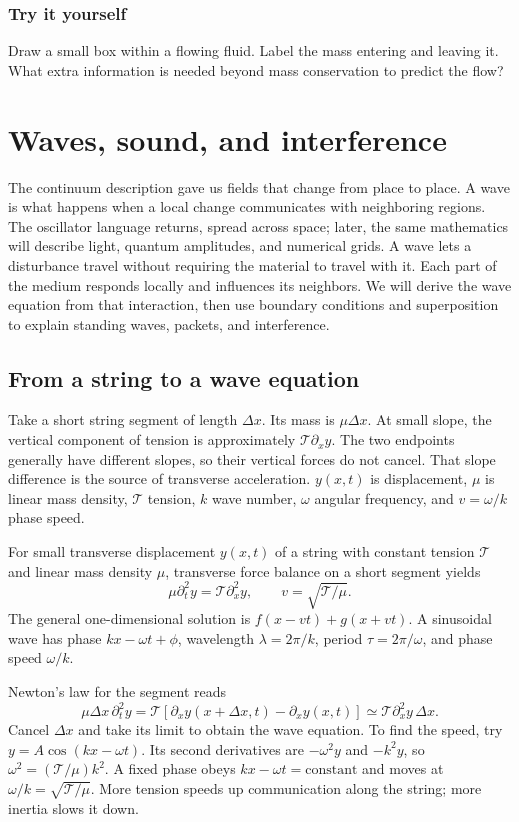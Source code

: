 \documentclass[11pt,oneside]{book}
\theoremstyle{reviewstyle}
\newcommand{\learningcheck}[1]{\subsection*{Try it yourself}\noindent #1\par}
\begin{document}
\learningcheck{Draw a small box within a flowing fluid. Label the mass entering and leaving it. What extra information is needed beyond mass conservation to predict the flow?}

\chapter{Waves, sound, and interference}
The continuum description gave us fields that change from place to place. A wave is what happens when a local change communicates with neighboring regions. The oscillator language returns, spread across space; later, the same mathematics will describe light, quantum amplitudes, and numerical grids.
A wave lets a disturbance travel without requiring the material to travel with it. Each part of the medium responds locally and influences its neighbors. We will derive the wave equation from that interaction, then use boundary conditions and superposition to explain standing waves, packets, and interference.

\section{From a string to a wave equation}
Take a short string segment of length $\Delta x$. Its mass is $\mu\Delta x$. At small slope, the vertical component of tension is approximately $\mathcal T\partial_xy$. The two endpoints generally have different slopes, so their vertical forces do not cancel. That slope difference is the source of transverse acceleration. $y(x,t)$ is displacement, $\mu$ is linear mass density, $\mathcal T$ tension, $k$ wave number, $\omega$ angular frequency, and $v=\omega/k$ phase speed.

For small transverse displacement $y(x,t)$ of a string with constant tension $\mathcal T$ and linear mass density $\mu$, transverse force balance on a short segment yields
\begin{equation}
\mu\partial_t^2y=\mathcal T\partial_x^2y,\qquad v=\sqrt{\mathcal T/\mu}.
\end{equation}
The general one-dimensional solution is $f(x-vt)+g(x+vt)$. A sinusoidal wave has phase $kx-\omega t+\phi$, wavelength $\lambda=2\pi/k$, period $\tau=2\pi/\omega$, and phase speed $\omega/k$.

Newton's law for the segment reads
\begin{equation}
\mu\Delta x\,\partial_t^2y
=\mathcal T[\partial_xy(x+\Delta x,t)-\partial_xy(x,t)]
\simeq\mathcal T\partial_x^2y\,\Delta x.
\end{equation}
Cancel $\Delta x$ and take its limit to obtain the wave equation. To find the speed, try $y=A\cos(kx-\omega t)$. Its second derivatives are $-\omega^2y$ and $-k^2y$, so $\omega^2=(\mathcal T/\mu)k^2$. A fixed phase obeys $kx-\omega t=\text{constant}$ and moves at $\omega/k=\sqrt{\mathcal T/\mu}$. More tension speeds up communication along the string; more inertia slows it down.
\end{document}

